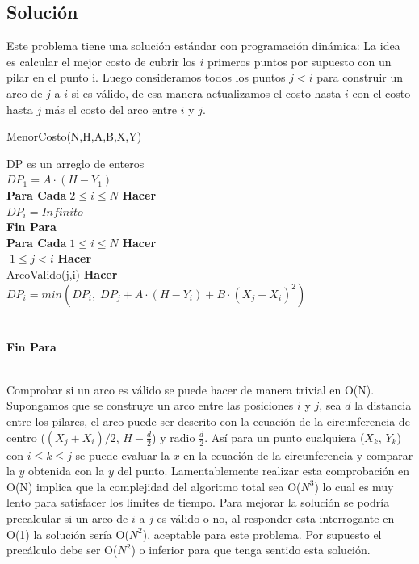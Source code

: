 \documentclass{report}
\begin{document}
\subsection{Soluci\'on}
Este problema tiene una soluci\'on est\'andar con programaci\'on din\'amica: La idea es calcular el mejor costo de cubrir los $i$ primeros puntos por supuesto con un pilar en el punto i. Luego consideramos todos los puntos $j < i$ para construir un arco de $j$ a $i$ si es v\'alido, de esa manera actualizamos el costo hasta $i$ con el costo hasta $j$ m\'as el costo del arco entre $i$ y $j$.\\
\begin{algorithm}[H] %
	\caption{MenorCosto(N,H,A,B,X,Y)}\label{ML:Algorithm3}
	\SetAlgoLined
	\LinesNumbered
	\SetAlgoVlined
	DP es un arreglo de enteros\\
	${DP}_1 = A \cdot (H - Y_1)$\\
	{\bf Para Cada}$\;2 \leq i \leq N$ {\bf Hacer}\\
	\hspace{1cm} $DP_i = Infinito$\\
	{\bf Fin Para}\\
	{\bf Para Cada}$\;1 \leq i \leq N$ {\bf Hacer}\\
	\hspace{1cm}{\bf Para Cada}$\;1 \leq j < i$ {\bf Hacer}\\
	\hspace{2cm}{\bf Si} ArcoValido(j,i) {\bf Hacer}\\ 
	\hspace{3cm}$DP_i = min(DP_i,\; DP_j + A\cdot(H-Y_i) + B\cdot{(X_j-X_i)}^2)$\\
	\hspace{2cm}{\bf Fin Si}\\
	\hspace{1cm}{\bf Fin Para}\\
	{\bf Fin Para}\\

\end{algorithm}
\hspace{1cm}\\
Comprobar si un arco es v\'alido se puede hacer de manera trivial en O(N). Supongamos que se construye un arco entre las posiciones $i$ y $j$, sea $d$ la distancia entre los pilares, el arco  puede ser descrito con la ecuaci\'on de la circunferencia de centro ($(X_j + X_i)/2$, $H - \frac{d}{2}$) y radio $\frac{d}{2}$. As\'i para un punto cualquiera ($X_k$, $Y_k$) con $i\leq k\leq j$ se puede evaluar la $x$ en la ecuaci\'on de la circunferencia y comparar la $y$ obtenida con la $y$ del punto. Lamentablemente realizar esta comprobaci\'on en O(N) implica que la complejidad del algoritmo total sea O($N^3$) lo cual es muy lento para satisfacer los l\'imites de tiempo. Para mejorar la soluci\'on se podr\'ia precalcular si un arco de $i$ a $j$ es v\'alido o no, al responder esta interrogante en O(1) la soluci\'on ser\'ia O($N^2$), aceptable para este problema. Por supuesto el prec\'alculo debe ser O($N^2$) o inferior para que tenga sentido esta soluci\'on.\\
\end{document}

